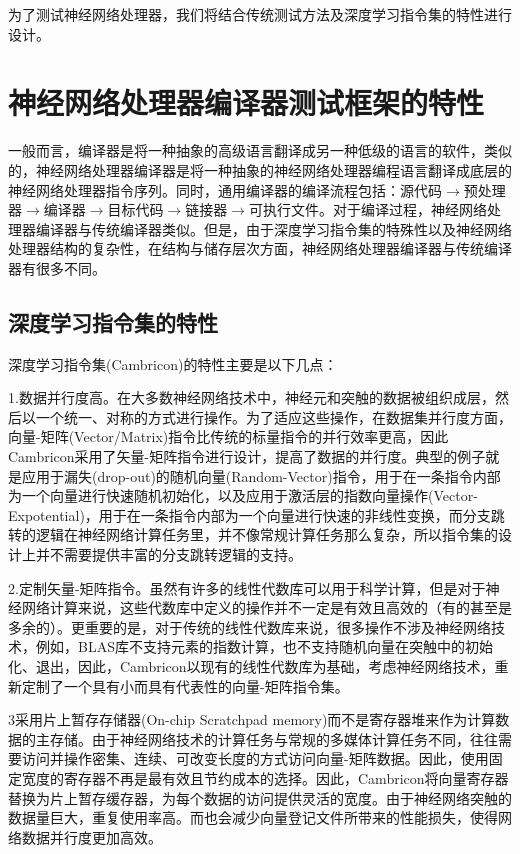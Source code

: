 为了测试神经网络处理器，我们将结合传统测试方法及深度学习指令集的特性进行设计。

\section{神经网络处理器编译器测试框架的特性}

一般而言，编译器是将一种抽象的高级语言翻译成另一种低级的语言的软件，类似的，神经网络处理器编译器是将一种抽象的神经网络处理器编程语言翻译成底层的神经网络处理器指令序列。同时，通用编译器的编译流程包括：源代码$\rightarrow$预处理器$\rightarrow$编译器$\rightarrow$目标代码$\rightarrow$链接器$\rightarrow$可执行文件。对于编译过程，神经网络处理器编译器与传统编译器类似。但是，由于深度学习指令集的特殊性以及神经网络处理器结构的复杂性，在结构与储存层次方面，神经网络处理器编译器与传统编译器有很多不同。

\subsection{深度学习指令集的特性}
深度学习指令集(Cambricon)的特性主要是以下几点\cite{liu2016cambricon}：

1.数据并行度高。在大多数神经网络技术中，神经元和突触的数据被组织成层，然后以一个统一、对称的方式进行操作。为了适应这些操作，在数据集并行度方面，向量-矩阵(Vector/Matrix)指令比传统的标量指令的并行效率更高，因此Cambricon采用了矢量-矩阵指令进行设计，提高了数据的并行度。典型的例子就是应用于漏失(drop-out)的随机向量(Random-Vector)指令，用于在一条指令内部为一个向量进行快速随机初始化，以及应用于激活层的指数向量操作(Vector-Expotential)，用于在一条指令内部为一个向量进行快速的非线性变换，而分支跳转的逻辑在神经网络计算任务里，并不像常规计算任务那么复杂，所以指令集的设计上并不需要提供丰富的分支跳转逻辑的支持。

2.定制矢量-矩阵指令。虽然有许多的线性代数库可以用于科学计算，但是对于神经网络计算来说，这些代数库中定义的操作并不一定是有效且高效的（有的甚至是多余的）。更重要的是，对于传统的线性代数库来说，很多操作不涉及神经网络技术，例如，BLAS库\cite{eijkhout2014introduction}不支持元素的指数计算，也不支持随机向量在突触中的初始化、退出，因此，Cambricon以现有的线性代数库为基础，考虑神经网络技术，重新定制了一个具有小而具有代表性的向量-矩阵指令集。

3采用片上暂存存储器(On-chip Scratchpad memory)而不是寄存器堆来作为计算数据的主存储。由于神经网络技术的计算任务与常规的多媒体计算任务不同，往往需要访问并操作密集、连续、可改变长度的方式访问向量-矩阵数据。因此，使用固定宽度的寄存器不再是最有效且节约成本的选择。因此，Cambricon将向量寄存器替换为片上暂存缓存器，为每个数据的访问提供灵活的宽度。由于神经网络突触的数据量巨大，重复使用率高。而也会减少向量登记文件所带来的性能损失，使得网络数据并行度更加高效。

